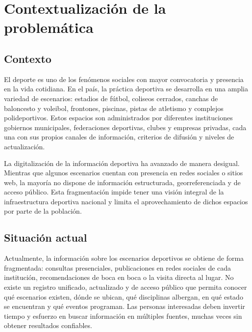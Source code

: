 
\section{Contextualizaci\'on de la problem\'atica}

\subsection{Contexto}

El deporte es uno de los fen\'omenos sociales con mayor convocatoria y presencia
en la vida cotidiana. En el pa\'is, la pr\'actica deportiva se desarrolla en una
amplia variedad de escenarios: estadios de f\'utbol, coliseos cerrados, canchas
de baloncesto y voleibol, frontones, piscinas, pistas de atletismo y complejos
polideportivos. Estos espacios son administrados por diferentes instituciones
\textemdash{}gobiernos municipales, federaciones deportivas, clubes y empresas
privadas\textemdash{}, cada una con sus propios canales de informaci\'on, criterios
de difusi\'on y niveles de actualizaci\'on.

La digitalizaci\'on de la informaci\'on deportiva ha avanzado de manera desigual.
Mientras que algunos escenarios cuentan con presencia en redes sociales o
sitios web, la mayor\'ia no dispone de informaci\'on estructurada, georreferenciada
y de acceso p\'ublico. Esta fragmentaci\'on impide tener una visi\'on integral de
la infraestructura deportiva nacional y limita el aprovechamiento de dichos
espacios por parte de la poblaci\'on.

\subsection{Situaci\'on actual}

Actualmente, la informaci\'on sobre los escenarios deportivos se obtiene de forma
fragmentada: consultas presenciales, publicaciones en redes sociales de cada
instituci\'on, recomendaciones de boca en boca o la visita directa al lugar. No
existe un registro unificado, actualizado y de acceso p\'ublico que permita
conocer qu\'e escenarios existen, d\'onde se ubican, qu\'e disciplinas albergan, en
qu\'e estado se encuentran y qu\'e eventos programan. Las personas interesadas
deben invertir tiempo y esfuerzo en buscar informaci\'on en m\'ultiples fuentes,
muchas veces sin obtener resultados confiables.

